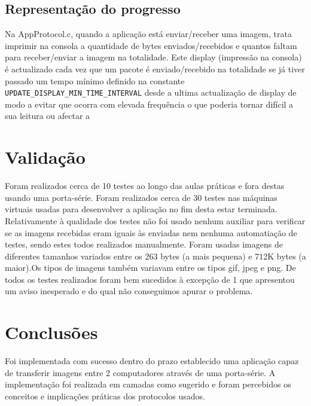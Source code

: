 \documentclass[11pt,a4paper,reqno]{report}
\numberwithin{equation}{section}
\begin{document}
\section{Representação do progresso}
Na AppProtocol.c, quando a aplicação está enviar/receber uma imagem, trata imprimir na consola a quantidade de bytes enviados/recebidos e quantos faltam para receber/enviar a imagem na totalidade. Este display (impressão na consola) é actualizado cada vez que um pacote é enviado/recebido na totalidade se já tiver passado um tempo mínimo definido na constante \verb|UPDATE_DISPLAY_MIN_TIME_INTERVAL| desde a ultima actualização de display de modo a evitar que ocorra com elevada frequência o que poderia tornar difícil a sua leitura ou afectar a

\chapter{Validação}

Foram realizados cerca de 10 testes ao longo das aulas práticas e fora destas usando uma porta-série.
Foram realizados cerca de 30 testes nas máquinas virtuais usadas para desenvolver a aplicação no fim desta estar terminada.
Relativamente à qualidade dos testes não foi usado nenhum auxiliar para verificar se as imagens recebidas eram iguais às enviadas nem nenhuma automatiação de testes, sendo estes todos realizados manualmente. 
Foram usadas imagens de diferentes tamanhos variados entre os 263 bytes (a mais pequena) e 712K bytes (a maior).Os tipos de imagens também variavam entre os tipos gif, jpeg e png.
De todos os testes realizados foram bem sucedidos à excepção de 1 que apresentou um aviso inesperado e do qual não conseguimos apurar o problema.

\chapter{Conclusões}

Foi implementada com sucesso dentro do prazo establecido uma aplicação capaz de transferir imagens entre 2 computadores através de uma porta-série.
A implementação foi realizada em camadas como sugerido e foram percebidos os conceitos e implicações práticas dos protocolos usados.




\end{document}
